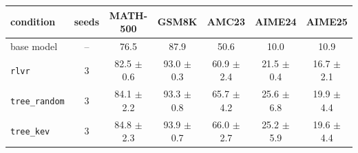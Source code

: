 \begin{tabular}{@{}lcccccc@{}}
\toprule
condition & seeds & MATH-500 & GSM8K & AMC23 & AIME24 & AIME25 \\ \midrule
base model & -- & 76.5 & 87.9 & 50.6 & 10.0 & 10.9 \\ \midrule
\texttt{rlvr} & 3 & 82.5 $\pm$ 0.6 & 93.0 $\pm$ 0.3 & 60.9 $\pm$ 2.4 & 21.5 $\pm$ 0.4 & 16.7 $\pm$ 2.1 \\
\texttt{tree\_random} & 3 & 84.1 $\pm$ 2.2 & 93.3 $\pm$ 0.8 & 65.7 $\pm$ 4.2 & 25.6 $\pm$ 6.8 & 19.9 $\pm$ 4.4 \\
\texttt{tree\_kev} & 3 & 84.8 $\pm$ 2.3 & 93.9 $\pm$ 0.7 & 66.0 $\pm$ 2.7 & 25.2 $\pm$ 5.9 & 19.6 $\pm$ 4.4 \\
\bottomrule
\end{tabular}
